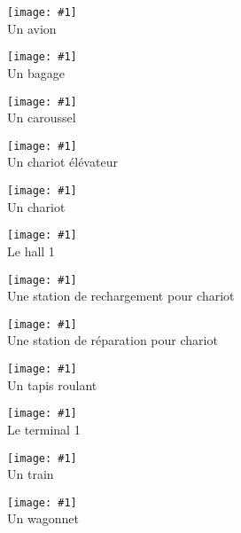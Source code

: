 \newcommand{\grouptwo}[2] {
    \begin{center}
    \begin{minipage}{\linewidth}
	\begin{minipage}[b]{0.5\linewidth}
	#1
	\end{minipage}
	\hspace{0.5cm}
	\begin{minipage}[b]{0.5\linewidth}
	#2
	\end{minipage}
    \end{minipage}
    \end{center}
    \vspace{2cm}
}


\newcommand{\image}[2]{%
    \begin{center}
	    \texttt{[image: \#1]}\\
	    #2
    \end{center}
}

\hspace{-1cm} \grouptwo{\image{img/avion.pdf}{Un avion}}{\image{img/bagages.pdf}{Un bagage}}
\grouptwo{\image{img/caroussel.pdf}{Un caroussel}}{\image{img/Chariot-elevateur.pdf}{Un chariot élévateur}}
\grouptwo{\image{img/chariot.pdf}{Un chariot}}{\image{img/Hall.pdf}{Le hall 1}}
\grouptwo{\image{img/rechargement-batterie.pdf}{Une station de rechargement pour chariot}}{\image{img/Reparation-chariot.pdf}{Une station de réparation pour chariot}}
\grouptwo{\image{img/tapis-roulant.pdf}{Un tapis roulant}}{\image{img/Terminal.pdf}{Le terminal 1}}
\grouptwo{\image{img/train.pdf}{Un train}}{\image{img/wagonnet.pdf}{Un wagonnet}} 

